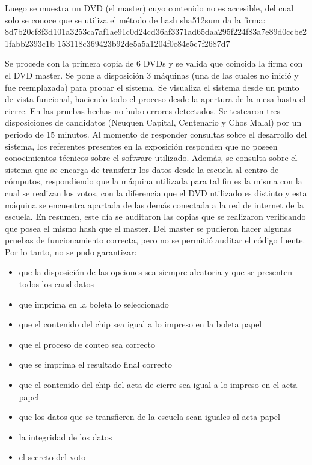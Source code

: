 Luego se muestra un DVD (el master) cuyo contenido no es accesible, del cual solo se conoce que se utiliza el método de hash sha512sum da la firma: \newline
8d7b20cf8f3d101a3253ca7af1ae91c0d24cd36af3371ad65daa295f224f83a7e89d0ccbe21fabb2393c1b \newline 153118c369423b92de5a5a1204f0c84e5c7f2687d7  

Se procede con la primera copia de 6 DVDs y se valida que coincida la firma con el DVD master.  
Se pone a disposición 3 máquinas (una de las cuales no inició y fue reemplazada) para probar el sistema. Se visualiza el sistema desde un punto de vista funcional, haciendo todo el proceso desde la apertura de la mesa hasta el cierre. En las pruebas hechas no hubo errores detectados. Se testearon tres disposiciones de candidatos (Neuquen Capital, Centenario y Chos Malal) por un periodo de 15 minutos. 
Al momento de responder consultas sobre el desarrollo del sistema, los referentes presentes en la exposición responden que no poseen conocimientos técnicos sobre el software utilizado. Además, se consulta sobre el sistema que se encarga de transferir los datos desde la escuela al centro de cómputos, respondiendo que la máquina utilizada para tal fin es la misma con la cual se realizan los votos, con la diferencia que el DVD utilizado es distinto y esta máquina se encuentra apartada de las demás conectada a la red de internet de la escuela. \newline
En resumen, este día se auditaron las copias que se realizaron verificando que posea el mismo hash que el master.  Del master se pudieron hacer algunas pruebas de funcionamiento correcta, pero no se permitió auditar el código fuente. Por lo tanto, no se pudo garantizar: 
 \begin{itemize}
     \item que la disposición de las opciones sea siempre aleatoria y que se presenten todos los candidatos 
     \item que imprima en la boleta lo seleccionado 
     \item que el contenido del chip sea igual a lo impreso en la boleta papel 
     \item que el proceso de conteo sea correcto 
     \item que se imprima el resultado final correcto 
     \item que el contenido del chip del acta de cierre sea igual a lo impreso en el acta papel 
     \item que los datos que se transfieren de la escuela sean iguales al acta papel
     \item la integridad de los datos
     \item el secreto del voto
 \end{itemize}


